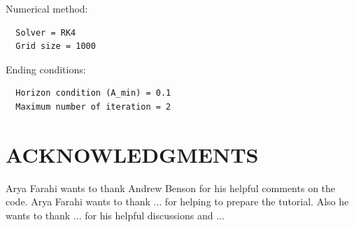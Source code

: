 \documentclass[12pt]{article}
\begin{document}
Numerical method:
\begin{verbatim}
  Solver = RK4
  Grid size = 1000
\end{verbatim}

Ending conditions:
\begin{verbatim}
  Horizon condition (A_min) = 0.1
  Maximum number of iteration = 2
\end{verbatim}


\section*{ACKNOWLEDGMENTS}
 Arya Farahi wants to thank Andrew Benson for his helpful comments on the code. Arya Farahi wants to thank ... for helping to prepare the tutorial. Also he wants to thank ... for his helpful discussions and ...

 
\end{document}
